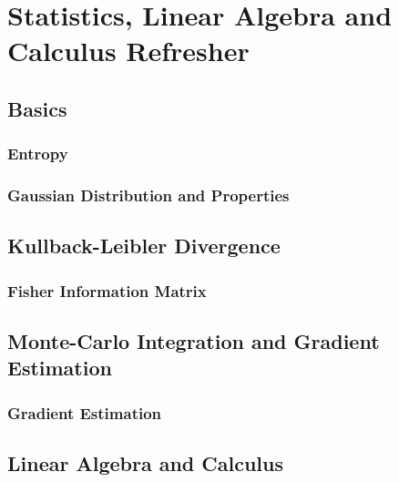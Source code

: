 \lstset{language = Python}



\chapter{Statistics, Linear Algebra and Calculus Refresher} %

	\section{Basics} %

		\subsection{Entropy} %

		\subsection{Gaussian Distribution and Properties} %

	\section{Kullback-Leibler Divergence} %
		\label{sec:klDivergence}


		\subsection{Fisher Information Matrix} %
			\label{subsec:fisherInformationMatrix}


	\section{Monte-Carlo Integration and Gradient Estimation} %

		\subsection{Gradient Estimation} %

	\section{Linear Algebra and Calculus} %

